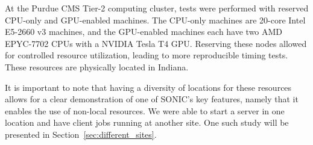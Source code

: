 At the Purdue CMS Tier-2 computing cluster, tests were performed with reserved CPU-only and GPU-enabled machines. The CPU-only machines are 20-core Intel E5-2660 v3 machines, and the GPU-enabled machines each have two AMD EPYC-7702 CPUs with a NVIDIA Tesla T4 GPU. Reserving these nodes allowed for controlled resource utilization, leading to more reproducible timing tests. These resources are physically located in Indiana.

It is important to note that having a diversity of locations for these resources allows for a clear demonstration of one of SONIC's key features, namely that it enables the use of non-local resources. We were able to start a server in one location and have client jobs running at another site. One such study will be presented in Section~\ref{sec:different_sites}.






